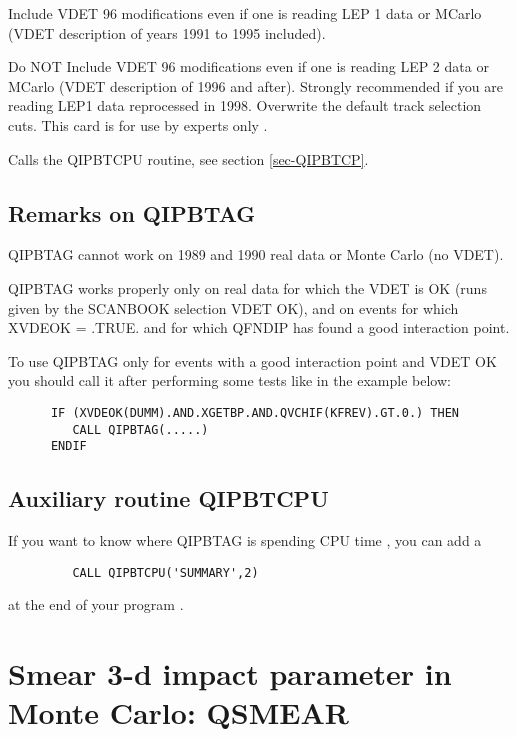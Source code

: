 \begin{indentlist}{ 3.50cm}{ 3.75cm}
    Include VDET 96 modifications even if one is reading LEP 1 data or MCarlo
                     (VDET description of years 1991 to 1995 included).

    Do NOT Include VDET 96 modifications even if one is reading LEP 2 data or MCarlo
                     (VDET description of 1996 and after).
                     Strongly recommended if you are reading  LEP1 data reprocessed in 1998.   
   Overwrite the default track selection cuts.
                    This card is for use by experts only .
 
   Calls the QIPBTCPU routine, see section \ref{sec-QIPBTCP}.
\end{indentlist}
\par
\subsection{\label{sec-QIPBCR}Remarks on QIPBTAG}
 QIPBTAG cannot work  on 1989 and 1990 real data or Monte Carlo (no VDET).
\par
 QIPBTAG                              works properly only on real data for which
the VDET is OK (runs given by the SCANBOOK selection VDET OK), and on
events for which XVDEOK = .TRUE. and for which QFNDIP has found a good
interaction point.


\par
To use QIPBTAG only for events with a good interaction point
and VDET OK  you should call it after performing some tests like
in the example below:
\begin{verbatim}
      IF (XVDEOK(DUMM).AND.XGETBP.AND.QVCHIF(KFREV).GT.0.) THEN
         CALL QIPBTAG(.....)
      ENDIF
\end{verbatim}
 
\par
\subsection{\label{sec-QIPBTCP}Auxiliary routine  QIPBTCPU}
\par
If you want to know where QIPBTAG is spending CPU time , you can add a
\begin{verbatim}
         CALL QIPBTCPU('SUMMARY',2)
\end{verbatim}
  at the end of your program .


\par
\section{\label{sec-QSMCALL}Smear 3-d impact parameter in Monte Carlo: QSMEAR}



